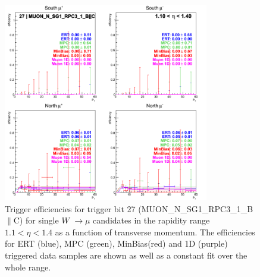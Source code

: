 \begin{figure}[h!]

  \centering

  \includegraphics[width=0.8\textwidth]{./figures/run13_trigeffipt_eta0_trig27_lin.png}
  \caption{\label{fig:run13_trigeffipt_eta0_nper0_trig27_lin} Trigger efficiencies for trigger bit 27 (MUON\_N\_SG1\_RPC3\_1\_B$\|$C) for single $W$ $\rightarrow \mu$ candidates in the rapidity range $ 1.1 < \eta < 1.4$ as a function of transverse momentum. The efficiencies for ERT (blue), MPC (green), MinBias(red) and 1D (purple) triggered data samples are shown as well as a constant fit over the whole range.}

\end{figure}
\clearpage
